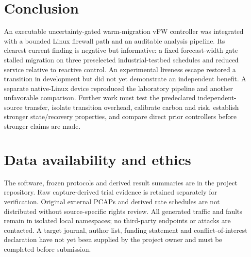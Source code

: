 \documentclass[11pt]{article}
\begin{document}
\section{Conclusion}
An executable uncertainty-gated warm-migration vFW controller was integrated with a bounded Linux firewall path and an auditable analysis pipeline. Its clearest current finding is negative but informative: a fixed forecast-width gate stalled migration on three preselected industrial-testbed schedules and reduced service relative to reactive control. An experimental liveness escape restored a transition in development but did not yet demonstrate an independent benefit. A separate native-Linux device reproduced the laboratory pipeline and another unfavorable comparison. Further work must test the predeclared independent-source transfer, isolate transition overhead, calibrate carbon and risk, establish stronger state/recovery properties, and compare direct prior controllers before stronger claims are made.

\section*{Data availability and ethics}
The software, frozen protocols and derived result summaries are in the project repository. Raw capture-derived trial evidence is retained separately for verification. Original external PCAPs and derived rate schedules are not distributed without source-specific rights review. All generated traffic and faults remain in isolated local namespaces; no third-party endpoints or attacks are contacted. A target journal, author list, funding statement and conflict-of-interest declaration have not yet been supplied by the project owner and must be completed before submission.
\end{document}
